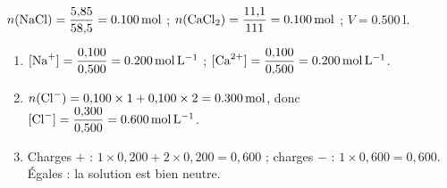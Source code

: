\documentclass[11pt,a4paper]{article}
\begin{document}
\begin{corrige}
$n(\ce{NaCl}) = \dfrac{5{,}85}{58{,}5} = \SI{0.100}{\mole}$ ; $n(\ce{CaCl2}) = \dfrac{11{,}1}{111} = \SI{0.100}{\mole}$ ; $V = \SI{0.500}{\litre}$.
\begin{enumerate}[label=\alph*)]
  \item $[\ce{Na+}] = \dfrac{0{,}100}{0{,}500} = \SI{0.200}{\mole\per\litre}$ ;
        $[\ce{Ca^2+}] = \dfrac{0{,}100}{0{,}500} = \SI{0.200}{\mole\per\litre}$.
  \item $n(\ce{Cl-}) = 0{,}100\times 1 + 0{,}100\times 2 = \SI{0.300}{\mole}$, donc
        $[\ce{Cl-}] = \dfrac{0{,}300}{0{,}500} = \SI{0.600}{\mole\per\litre}$.
  \item Charges $+$ : $1\times 0{,}200 + 2\times 0{,}200 = 0{,}600$ ; charges $-$ : $1\times 0{,}600 = 0{,}600$.
        Égales : la solution est bien neutre.
\end{enumerate}
\end{corrige}
\end{document}
